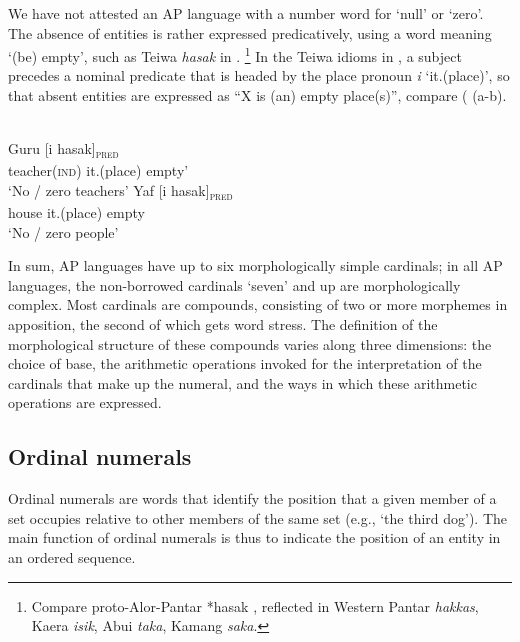 We have not attested an AP language with a number word for `null' or `zero'. The absence of entities is rather expressed predicatively, using a word meaning `(be) empty', such as Teiwa \textit{hasak} in .
\footnote{{}  Compare proto-Alor-Pantar *hasak \citep{HoltonRobinsonTVhistory}, reflected in Western Pantar \textit{hakkas}, Kaera \textit{isik}, Abui \textit{taka}, Kamang \textit{saka}.} In the Teiwa idioms in , a subject precedes a nominal predicate that is headed by the place pronoun \textit{i} `it.(place)', so that absent entities are expressed as ``X is (an) empty place(s)'', compare ( (a-b).


\ea%
\label{bkm:Ref355363568}
\\
\ea
\label{ex:8:1234}
\gll Guru       [i       hasak]\textsubscript{\textsc{pred}} \\  
     teacher\textsc{(ind)}   it.(place)    empty'  \\
\glt  `No / zero teachers' 
\ex
\gll Yaf [i     hasak]\textsubscript{\textsc{pred}} \\
    house      it.(place)   empty\\
\glt    `No / zero people' 
\z
\z

In sum, AP languages have up to six morphologically simple cardinals; in all AP languages, the non-borrowed cardinals `seven' and up are morphologically complex. Most cardinals are compounds, consisting of two or more morphemes in apposition, the second of which gets word stress. The definition of the morphological structure of these compounds varies along three dimensions: the choice of base, the arithmetic operations invoked for the interpretation of the cardinals that make up the numeral, and the ways in which these arithmetic operations are expressed. 

\subsection{Ordinal  numerals}
\label{sec:8:Ordinal}
Ordinal numerals are words that identify the position that a given member of a set occupies relative to other members of the same set (e.g., `the third dog'). The main function of ordinal numerals is thus to indicate the position of an entity in an ordered sequence. 

